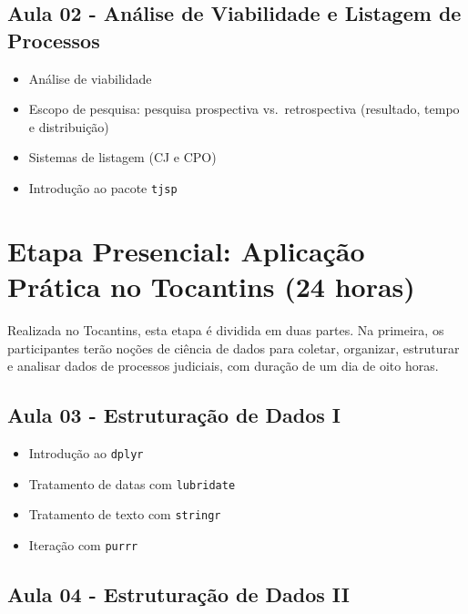 \documentclass[
  letterpaper,
  DIV=11,
  numbers=noendperiod]{scrreprt}
\providecommand{\tightlist}{%
  \setlength{\itemsep}{0pt}\setlength{\parskip}{0pt}}
\begin{document}
\subsection{Aula 02 - Análise de Viabilidade e Listagem de
Processos}\label{aula-02---anuxe1lise-de-viabilidade-e-listagem-de-processos}

\begin{itemize}
\tightlist
\item
  Análise de viabilidade\\
\item
  Escopo de pesquisa: pesquisa prospectiva vs.~retrospectiva (resultado,
  tempo e distribuição)\\
\item
  Sistemas de listagem (CJ e CPO)\\
\item
  Introdução ao pacote \texttt{tjsp}
\end{itemize}

\section{Etapa Presencial: Aplicação Prática no Tocantins (24
horas)}\label{etapa-presencial-aplicauxe7uxe3o-pruxe1tica-no-tocantins-24-horas}

Realizada no Tocantins, esta etapa é dividida em duas partes. Na
primeira, os participantes terão noções de ciência de dados para
coletar, organizar, estruturar e analisar dados de processos judiciais,
com duração de um dia de oito horas.

\subsection{Aula 03 - Estruturação de Dados
I}\label{aula-03---estruturauxe7uxe3o-de-dados-i}

\begin{itemize}
\tightlist
\item
  Introdução ao \texttt{dplyr}\\
\item
  Tratamento de datas com \texttt{lubridate}\\
\item
  Tratamento de texto com \texttt{stringr}\\
\item
  Iteração com \texttt{purrr}
\end{itemize}

\subsection{Aula 04 - Estruturação de Dados
II}\label{aula-04---estruturauxe7uxe3o-de-dados-ii}
\end{document}
